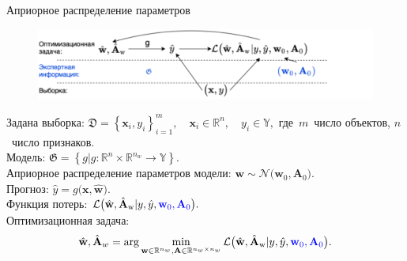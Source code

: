 \documentclass[10pt,pdf,hyperref={unicode}]{beamer}
\begin{document}
\begin{frame}{Априорное распределение параметров}
\justifying

\begin{figure}[h!]
\includegraphics[width=1.0\textwidth]{figures/introdigram.png}
\end{figure}

Задана выборка:
$
	\mathfrak{D} = \left\{\mathbf{x}_i, y_i\right\}_{i=1}^{m}, \quad 
	\mathbf{x}_{i} \in \mathbb{R}^{n}, \quad y_i \in \mathbb{Y},
$
где~$m$~число объектов, $n$~число признаков.\\[1mm]
Модель:
$
    \mathfrak{G} = \left\{g | g : \mathbb{R}^{n}\times \mathbb{R}^{n_{w}} \to \mathbb{Y} \right\}.
$\\[1mm]
{\color{blue}
Априорное распределение параметров модели:
$
    \mathbf{w} \sim \mathcal{N}\bigr(\mathbf{w}_0, \mathbf{A}_0\bigr).
$\\[1mm]
}
Прогноз:
$
    \hat{y} = g\bigr(\mathbf{x}, \hat{\mathbf{w}}).
$\\[1mm]
Функция потерь:
$
    \mathcal{L}\bigr(\hat{\mathbf{w}},\hat{\mathbf{A}}_{\text{w}}|y, \hat{y}, {\color{blue}\mathbf{w}_0, \mathbf{A}_0}\bigr).
$\\[1mm]
Оптимизационная задача:
\[
    \hat{\mathbf{w}}, \hat{\mathbf{A}}_{w} = \arg \min_{\mathbf{w} \in \mathbb{R}^{n_{w}}, \mathbf{A} \in \mathbb{R}^{n_{w}\times n_{w}}} \mathcal{L}\bigr(\hat{\mathbf{w}},\hat{\mathbf{A}}_{\text{w}}|y, \hat{y}, {\color{blue}\mathbf{w}_0, \mathbf{A}_0}\bigr).
\]
\end{frame}

\end{document}
